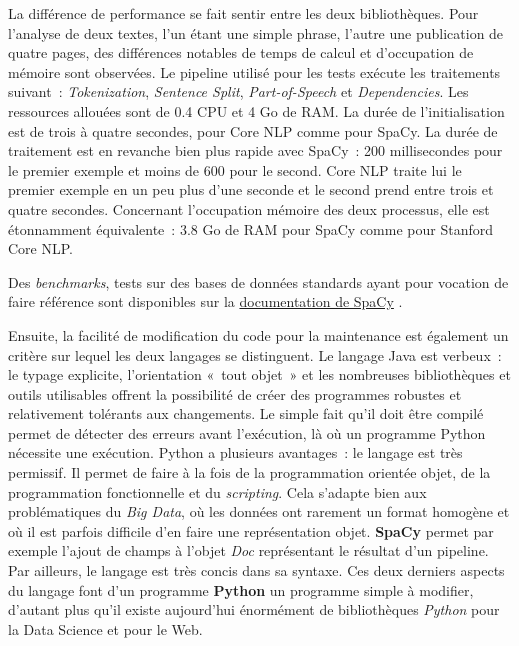 La différence de performance se fait sentir entre les deux bibliothèques. Pour l'analyse de deux textes, l'un étant une simple phrase, l'autre une publication de quatre pages, des différences notables de temps de calcul et d'occupation de mémoire sont observées. Le pipeline utilisé pour les tests exécute les traitements suivant~: \textit{Tokenization}, \textit{Sentence Split}, \textit{Part-of-Speech} et \textit{Dependencies}. Les ressources allouées sont de 0.4 CPU et 4 Go de RAM. La durée de l'initialisation est de trois à quatre secondes, pour Core NLP comme pour SpaCy. La durée de traitement est en revanche bien plus rapide avec SpaCy~: 200 millisecondes pour le premier exemple et moins de 600 pour le second. Core NLP traite lui le premier exemple en un peu plus d'une seconde et le second prend entre trois et quatre secondes. Concernant l'occupation mémoire des deux processus, elle est étonnamment équivalente~: 3.8 Go de RAM pour SpaCy comme pour Stanford Core NLP.

Des \textit{benchmarks}, tests sur des bases de données standards ayant pour vocation de faire référence sont disponibles sur la  \href{https://spacy.io/usage/facts-figures}{documentation de SpaCy} \cite{spacy-figures}.
\newline

Ensuite, la facilité de modification du code pour la maintenance est également un critère sur lequel les deux langages se distinguent. Le langage Java est verbeux~: le typage explicite, l'orientation «~tout objet~» et les nombreuses bibliothèques et outils utilisables offrent la possibilité de créer des programmes robustes et relativement tolérants aux changements. Le simple fait qu'il doit être compilé permet de détecter des erreurs avant l'exécution, là où un programme Python nécessite une exécution. Python a plusieurs avantages~: le langage est très permissif. Il permet de faire à la fois de la programmation orientée objet, de la programmation fonctionnelle et du \textit{scripting}. Cela s'adapte bien aux problématiques du \textit{Big Data}, où les données ont rarement un format homogène et où il est parfois difficile d'en faire une représentation objet. \textbf{SpaCy} permet par exemple l'ajout de champs à l'objet \textit{Doc} représentant le résultat d'un pipeline. Par ailleurs, le langage est très concis dans sa syntaxe. Ces deux derniers aspects du langage font d'un programme \textbf{Python} un programme simple à modifier, d'autant plus qu'il existe aujourd'hui énormément de bibliothèques \textit{Python} pour la Data Science et pour le Web.
\newline


